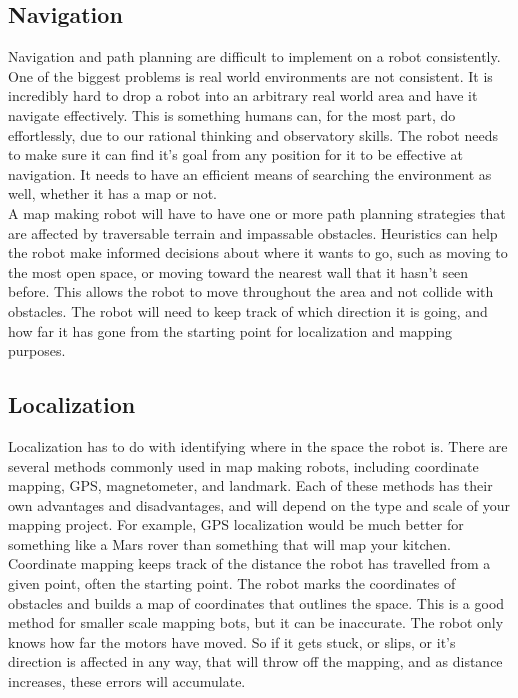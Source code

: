 \documentclass[12pt]{article}
\begin{document}

	\subsection{Navigation}
Navigation and path planning are difficult to implement on a robot consistently. One of the biggest problems is real world environments are not consistent. It is incredibly hard to drop a robot into an arbitrary real world area and have it navigate effectively. This is something humans can, for the most part, do effortlessly, due to our rational thinking and observatory skills. The robot needs to make sure it can find it’s goal from any position for it to be effective at navigation. It needs to have an efficient means of searching the environment as well, whether it has a map or not.\\

A map making robot will have to have one or more path planning strategies that are affected by traversable terrain and impassable obstacles. Heuristics can help the robot make informed decisions about where it wants to go, such as moving to the most open space, or moving toward the nearest wall that it hasn’t seen before. This allows the robot to move throughout the area and not collide with obstacles. The robot will need to keep track of which direction it is going, and how far it has gone from the starting point for localization and mapping purposes.

	\subsection{Localization}
Localization has to do with identifying where in the space the robot is. There are several methods commonly used in map making robots, including coordinate mapping, GPS, magnetometer, and landmark. Each of these methods has their own advantages and disadvantages, and will depend on the type and scale of your mapping project. For example, GPS localization would be much better for something like a Mars rover than something that will map your kitchen.\\

Coordinate mapping keeps track of the distance the robot has travelled from a given point, often the starting point. The robot marks the coordinates of obstacles and builds a map of coordinates that outlines the space. This is a good method for smaller scale mapping bots, but it can be inaccurate. The robot only knows how far the motors have moved. So if it gets stuck, or slips, or it’s direction is affected in any way, that will throw off the mapping, and as distance increases, these errors will accumulate. \\
\end{document}
